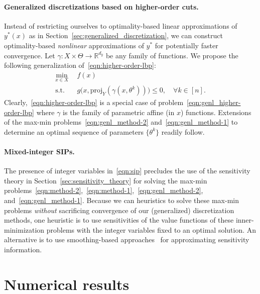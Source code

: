 \documentclass{article}
\newcommand{\R}{\mathbb{R}}
\newcommand{\1}[1]{\mathds{1}\left[#1\right]}
\begin{document}
\paragraph*{Generalized discretizations based on higher-order cuts.}
Instead of restricting ourselves to optimality-based linear approximations of $y^*(x)$ as in Section~\ref{sec:generalized_discretization}, we can construct optimality-based \textit{nonlinear} approximations of $y^*$ for potentially faster convergence.
Let $\gamma : X \times \Theta \to \R^{d_y}$ be any family of functions.
We propose the following generalization of~\eqref{eqn:higher-order-lbp}:
\begin{align}
\label{eqn:genl_higher-order-lbp}
\min_{x \in X} \:\: & f(x) \\
\text{s.t.} \:\: & g\bigl(x,\text{proj}_Y(\gamma(x,\theta^k))\bigr) \leq 0, \quad \forall k \in [n]. \nonumber
\end{align}
Clearly,~\eqref{eqn:higher-order-lbp} is a special case of problem~\eqref{eqn:genl_higher-order-lbp} where $\gamma$ is the family of parametric affine (in $x$) functions.
Extensions of the max-min problems~\eqref{eqn:genl_method-2} and~\eqref{eqn:genl_method-1} to determine an optimal sequence of parameters $\{\theta^k\}$ readily follow.



\paragraph*{Mixed-integer SIPs.}
The presence of integer variables in~\eqref{eqn:sip} precludes the use of the sensitivity theory in Section~\ref{sec:sensitivity_theory} for solving the max-min problems~\eqref{eqn:method-2},~\eqref{eqn:method-1},~\eqref{eqn:genl_method-2}, and~\eqref{eqn:genl_method-1}.
Because we can heuristics to solve these max-min problems \textit{without} sacrificing convergence of our (generalized) discretization methods, one heuristic is to use sensitivities of the value functions of these inner-minimization problems with the integer variables fixed to an optimal solution.
An alternative is to use smoothing-based approaches~\cite{ermoliev1995minimization} for approximating sensitivity information. 





\section{Numerical results}
\label{sec:numerical_results}
\end{document}
